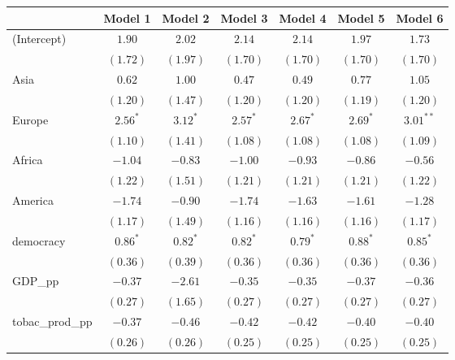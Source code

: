 
\begin{table}[!h]
\begin{center}
\begin{tabular}{l c c c c c c }
\toprule
 & Model 1 & Model 2 & Model 3 & Model 4 & Model 5 & Model 6 \\
\midrule
(Intercept)             & $1.90$     & $2.02$     & $2.14$      & $2.14$      & $1.97$      & $1.73$      \\
                        & $(1.72)$   & $(1.97)$   & $(1.70)$    & $(1.70)$    & $(1.70)$    & $(1.70)$    \\
Asia                    & $0.62$     & $1.00$     & $0.47$      & $0.49$      & $0.77$      & $1.05$      \\
                        & $(1.20)$   & $(1.47)$   & $(1.20)$    & $(1.20)$    & $(1.19)$    & $(1.20)$    \\
Europe                  & $2.56^{*}$ & $3.12^{*}$ & $2.57^{*}$  & $2.67^{*}$  & $2.69^{*}$  & $3.01^{**}$ \\
                        & $(1.10)$   & $(1.41)$   & $(1.08)$    & $(1.08)$    & $(1.08)$    & $(1.09)$    \\
Africa                  & $-1.04$    & $-0.83$    & $-1.00$     & $-0.93$     & $-0.86$     & $-0.56$     \\
                        & $(1.22)$   & $(1.51)$   & $(1.21)$    & $(1.21)$    & $(1.21)$    & $(1.22)$    \\
America                 & $-1.74$    & $-0.90$    & $-1.74$     & $-1.63$     & $-1.61$     & $-1.28$     \\
                        & $(1.17)$   & $(1.49)$   & $(1.16)$    & $(1.16)$    & $(1.16)$    & $(1.17)$    \\
democracy               & $0.86^{*}$ & $0.82^{*}$ & $0.82^{*}$  & $0.79^{*}$  & $0.88^{*}$  & $0.85^{*}$  \\
                        & $(0.36)$   & $(0.39)$   & $(0.36)$    & $(0.36)$    & $(0.36)$    & $(0.36)$    \\
GDP\_pp                 & $-0.37$    & $-2.61$    & $-0.35$     & $-0.35$     & $-0.37$     & $-0.36$     \\
                        & $(0.27)$   & $(1.65)$   & $(0.27)$    & $(0.27)$    & $(0.27)$    & $(0.27)$    \\
tobac\_prod\_pp         & $-0.37$    & $-0.46$    & $-0.42$     & $-0.42$     & $-0.40$     & $-0.40$     \\
                        & $(0.26)$   & $(0.26)$   & $(0.25)$    & $(0.25)$    & $(0.25)$    & $(0.25)$    \\

\end{tabular}
\end{center}
\end{table}
